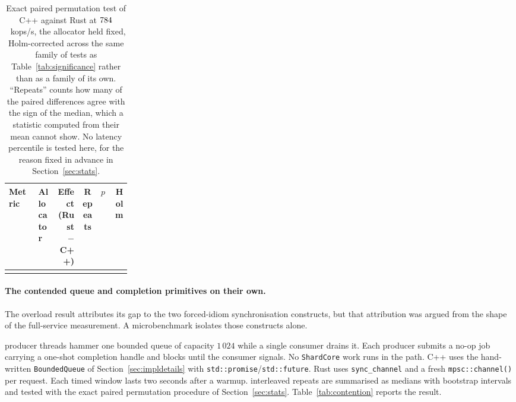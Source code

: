 \documentclass[english,oneside,a4paper,censored,csm,software-track-2020]{HYthesisML}
\begin{document}
\begin{table}[H]
\centering
\small
\caption[Exact paired test past saturation]{Exact paired permutation test of C++ against Rust at
$784$~kops/s, the allocator held fixed, Holm-corrected across the same family of
\NTests{} tests as Table~\ref{tab:significance} rather than as a family of its own. ``Repeats''
counts how many of the \NRepeats{} paired differences agree with the sign of the median, which a
statistic computed from their mean cannot show. No latency percentile is tested here, for the
reason fixed in advance in Section~\ref{sec:stats}.\label{tab:overloadtest}}
\setlength{\tabcolsep}{4pt}
\begin{tabular}{@{}p{0.24\linewidth} l r c r r@{}}
\hline\hline
Metric & Allocator & Effect (Rust $-$ C++) & Repeats & $p$ & Holm \\
\hline
\\
\hline
\end{tabular}
\end{table}

\paragraph{The contended queue and completion primitives on their own.}\label{sec:contention}
The overload result attributes its gap to the two forced-idiom synchronisation constructs, but
that attribution was argued from the shape of the full-service measurement. A microbenchmark
isolates those constructs alone.

\ContentionProducers{} producer threads hammer one bounded queue of capacity $1\,024$ while a
single consumer drains it. Each producer submits a no-op job carrying a one-shot completion handle and blocks
until the consumer signals. No \texttt{ShardCore} work runs in the path. C++ uses the
hand-written \texttt{BoundedQueue} of Section~\ref{sec:impldetails} with
\texttt{std::promise}/\texttt{std::future}. Rust uses \texttt{sync\_channel} and a fresh
\texttt{mpsc::channel()} per request. Each timed window lasts two seconds after a warmup.
\ContentionRepeats{} interleaved repeats are summarised as medians with bootstrap intervals and
tested with the exact paired permutation procedure of Section~\ref{sec:stats}.
Table~\ref{tab:contention} reports the result.
\end{document}
